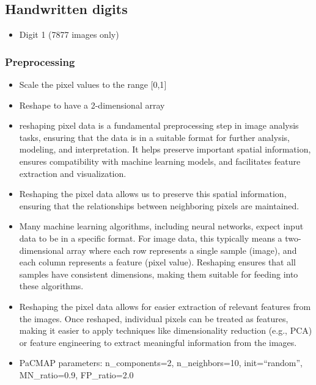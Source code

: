 \documentclass[
  12pt]{article}
\providecommand{\tightlist}{%
  \setlength{\itemsep}{0pt}\setlength{\parskip}{0pt}}\usepackage{longtable,booktabs,array}
\begin{document}
\hypertarget{handwritten-digits}{%
\subsection{Handwritten digits}\label{handwritten-digits}}

\begin{itemize}
\tightlist
\item
  Digit 1 (7877 images only)
\end{itemize}

\hypertarget{preprocessing}{%
\subsubsection{Preprocessing}\label{preprocessing}}

\begin{itemize}
\item
  Scale the pixel values to the range {[}0,1{]}
\item
  Reshape to have a 2-dimensional array
\item
  reshaping pixel data is a fundamental preprocessing step in image
  analysis tasks, ensuring that the data is in a suitable format for
  further analysis, modeling, and interpretation. It helps preserve
  important spatial information, ensures compatibility with machine
  learning models, and facilitates feature extraction and visualization.
\item
  Reshaping the pixel data allows us to preserve this spatial
  information, ensuring that the relationships between neighboring
  pixels are maintained.
\item
  Many machine learning algorithms, including neural networks, expect
  input data to be in a specific format. For image data, this typically
  means a two-dimensional array where each row represents a single
  sample (image), and each column represents a feature (pixel value).
  Reshaping ensures that all samples have consistent dimensions, making
  them suitable for feeding into these algorithms.
\item
  Reshaping the pixel data allows for easier extraction of relevant
  features from the images. Once reshaped, individual pixels can be
  treated as features, making it easier to apply techniques like
  dimensionality reduction (e.g., PCA) or feature engineering to extract
  meaningful information from the images.
\item
  PaCMAP parameters: n\_components=2, n\_neighbors=10, init=``random'',
  MN\_ratio=0.9, FP\_ratio=2.0
\end{itemize}
\end{document}
